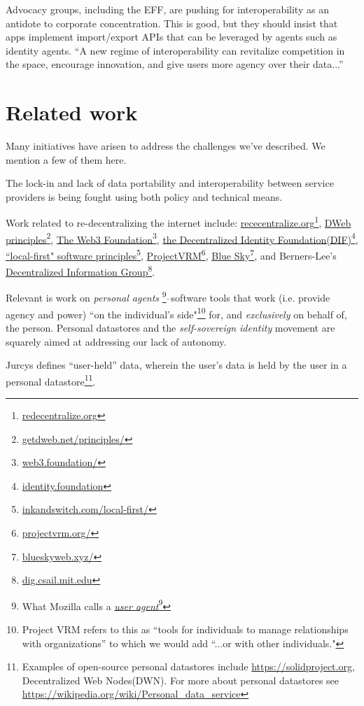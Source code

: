 \documentclass[11pt, oneside]{article}   	%
\newcommand{\hyperfootnote}[1][]{\def\ArgI{{#1}}\hyperfootnoteRelay}
\newcommand\hyperfootnoteRelay[2][]{\href{#1#2}{\ArgI}\footnote{\href{#1#2}{#2}}}
\begin{document}
Advocacy groups, including the EFF, are pushing for interoperability as an antidote to corporate concentration. This is good, but they should insist that apps implement import/export APIs that can be leveraged by agents such as identity agents. ``A new regime of interoperability can revitalize competition in the space, encourage innovation, and give users more agency over their data...''\cite{Cyphers2021} 

\section{Related work} %

Many initiatives have arisen to address the challenges we've described. We mention a few of them here.

The lock-in and lack of data portability and interoperability between service providers is being fought using both policy and technical means\cite{Doctorow2021}\cite{Cyphers2021}. 

Work related to re-decentralizing the internet include: \hyperfootnote[rececentralize.org][https://]{redecentralize.org}, \hyperfootnote[DWeb principles][https://]{getdweb.net/principles/}, \hyperfootnote[The Web3 Foundation][https://]{web3.foundation/}, \hyperfootnote[the Decentralized Identity Foundation(DIF)][https://]{identity.foundation}, \hyperfootnote[``local-first" software principles][https://]{inkandswitch.com/local-first/}, \hyperfootnote[ProjectVRM][https://]{projectvrm.org/}, \hyperfootnote[Blue Sky][https://]{blueskyweb.xyz/}, and Berners-Lee's \hyperfootnote[Decentralized Information Group][https://]{dig.csail.mit.edu}. 

Relevant is work on \emph{personal agents} \footnote{What Mozilla calls a \hyperfootnote[\emph{user agent}][https://]{developer.mozilla.org/en-US/docs/Glossary/User\_agent}}--software tools that work (i.e. provide agency and power) ``on the individual's side"\footnote{Project VRM\cite{Searls2019} refers to this as ``tools for individuals to manage relationships with organizations'' to which we would add ``...or with other individuals."} for, and \emph{exclusively} on behalf of, the person. Personal datastores and the \emph{self-sovereign identity}\cite{Preukschat2021} movement are squarely aimed at addressing our lack of autonomy.

Jurcys defines ``user-held'' data\cite{Jurcys2021}, wherein the user's data is held by the user in a personal datastore\footnote{Examples of open-source personal datastores include \url{https://solidproject.org}, Decentralized Web Nodes(DWN). For more about personal datastores see \url{https://wikipedia.org/wiki/Personal\_data\_service}}. 
\end{document}
